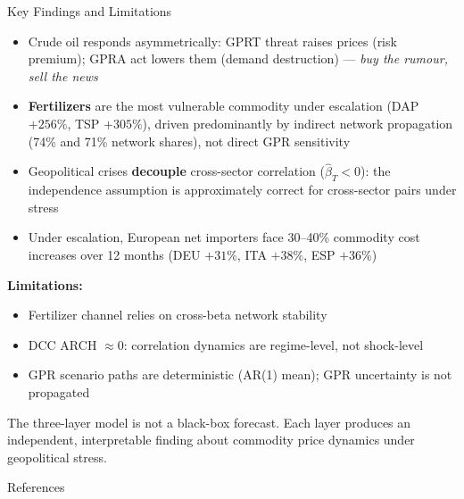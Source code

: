 ﻿\documentclass[aspectratio=1610]{beamer}
\begin{document}
\begin{frame}[shrink=10]{Key Findings and Limitations}

  \begin{itemize}
    \item Crude oil responds asymmetrically: GPRT threat raises prices
          (risk premium); GPRA act lowers them (demand destruction) ---
          \emph{buy the rumour, sell the news}
    \item \textbf{Fertilizers} are the most vulnerable commodity under escalation
          (DAP $+256\%$, TSP $+305\%$), driven predominantly by indirect network
          propagation (74\% and 71\% network shares), not direct GPR sensitivity
    \item Geopolitical crises \textbf{decouple} cross-sector correlation
          ($\hat{\beta}_T < 0$): the independence assumption is approximately
          correct for cross-sector pairs under stress
    \item Under escalation, European net importers face 30--40\% commodity cost
          increases over 12 months (DEU $+31\%$, ITA $+38\%$, ESP $+36\%$)
  \end{itemize}

  \textbf{Limitations:}
  \begin{itemize}
    \item Fertilizer channel relies on cross-beta network stability
    \item DCC ARCH $\approx 0$: correlation dynamics are regime-level, not
          shock-level
    \item GPR scenario paths are deterministic (AR(1) mean); GPR uncertainty
          is not propagated
  \end{itemize}

  \begin{alertblock}{}
    The three-layer model is not a black-box forecast. Each layer produces an
    independent, interpretable finding about commodity price dynamics under
    geopolitical stress.
  \end{alertblock}

\end{frame}

\begin{frame}[allowframebreaks]{References}
  \printbibliography
\end{frame}
\end{document}
